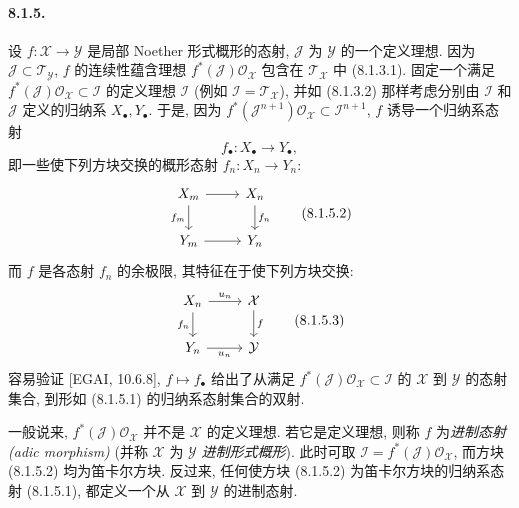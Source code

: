 \paragraph{8.1.5.}
设 $f:\mathcal X\to\mathcal Y$ 是局部 Noether 形式概形的态射, $\mathcal J$ 为 $\mathcal Y$ 的一个定义理想. 因为 $\mathcal J\subset\mathcal T_{\mathcal Y}$, $f$ 的连续性蕴含理想 $f^*(\mathcal J)\mathcal O_{\mathcal X}$ 包含在 $\mathcal T_{\mathcal X}$ 中 (8.1.3.1). 固定一个满足 $f^*(\mathcal J)\mathcal O_{\mathcal X}\subset\mathcal I$ 的定义理想 $\mathcal I$ (例如 $\mathcal I=\mathcal T_{\mathcal X}$), 并如 (8.1.3.2) 那样考虑分别由 $\mathcal I$ 和 $\mathcal J$ 定义的归纳系 $X_\bullet,Y_\bullet$. 于是, 因为 $f^*(\mathcal J^{n+1})\mathcal O_{\mathcal X}\subset\mathcal I^{n+1}$, $f$ 诱导一个归纳系态射
\begin{equation}f_\bullet:X_\bullet\longrightarrow Y_\bullet,\tag{8.1.5.1}\label{ch08:eq8151}\end{equation}
即一些使下列方块交换的概形态射 $f_n:X_n\to Y_n$:
\begin{equation}
\begin{tikzcd}X_m\arrow[r]\arrow[d,"f_m"']&X_n\arrow[d,"f_n"]\\Y_m\arrow[r]&Y_n\end{tikzcd}
\tag{8.1.5.2}\label{ch08:eq8152}\end{equation}
而 $f$ 是各态射 $f_n$ 的余极限, 其特征在于使下列方块交换:
\begin{equation}
\begin{tikzcd}X_n\arrow[r,"u_n"]\arrow[d,"f_n"']&\mathcal X\arrow[d,"f"]\\Y_n\arrow[r,"u_n"']&\mathcal Y\end{tikzcd}
\tag{8.1.5.3}\label{ch08:eq8153}\end{equation}
容易验证 [EGAI, 10.6.8], $f\mapsto f_\bullet$ 给出了从满足 $f^*(\mathcal J)\mathcal O_{\mathcal X}\subset\mathcal I$ 的 $\mathcal X$ 到 $\mathcal Y$ 的态射集合, 到形如 (8.1.5.1) 的归纳系态射集合的双射.

一般说来, $f^*(\mathcal J)\mathcal O_{\mathcal X}$ 并不是 $\mathcal X$ 的定义理想. 若它是定义理想, 则称 $f$ 为\emph{进制态射 (adic morphism)} (并称 $\mathcal X$ 为 $\mathcal Y$ \emph{进制形式概形}). 此时可取 $\mathcal I=f^*(\mathcal J)\mathcal O_{\mathcal X}$, 而方块 (8.1.5.2) 均为笛卡尔方块. 反过来, 任何使方块 (8.1.5.2) 为笛卡尔方块的归纳系态射 (8.1.5.1), 都定义一个从 $\mathcal X$ 到 $\mathcal Y$ 的进制态射.

